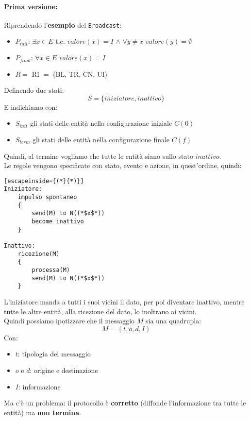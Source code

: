 \paragraph{Prima versione:} Riprendendo l'\textbf{esempio} del \texttt{Broadcast}: 
\begin{itemize}
	\item $P_{init}$: $\exists x \in E$ t.c. $valore (x) = I$ $\wedge$ $\forall y \neq x$ $valore (y) = \emptyset$
	\item $P_{final}$: $\forall x \in E$ $valore (x) = I$
	\item $R = $ RI $=$ (BL, TR, CN, UI)
\end{itemize}
Definendo due stati: 
$$ S = \{iniziatore, inattivo\} $$
E indichiamo con:
\begin{itemize}
	\item $S_{init}$ gli stati delle entità nella configurazione iniziale $C(0)$
	\item $S_{term}$ gli stati delle entità nella configurazione finale $C(f)$
\end{itemize}
Quindi, al termine vogliamo che tutte le entità siano sullo stato $inattivo$.\\

Le regole vengono specificate con stato, evento e azione, in quest'ordine, quindi: 
\begin{lstlisting}[escapeinside={(*}{*)}]
Iniziatore: 
	impulso spontaneo
	{	
		send(M) to N((*$x$*))
		become inattivo
	}
	
Inattivo: 
	ricezione(M)
	{	
		processa(M)
		send(M) to N((*$x$*))
	}
\end{lstlisting}

L'iniziatore manda a tutti i suoi vicini il dato, per poi diventare inattivo, mentre tutte le altre entità, alla ricezione del dato, lo inoltrano ai vicini.\\

Quindi possiamo ipotizzare che il messaggio $M$ sia una quadrupla: 
$$ M = (t, o, d, I)$$
Con: 
\begin{itemize}
	\item $t$: tipologia del messaggio
	\item $o$ e $d$: origine e destinazione
	\item $I$: informazione
\end{itemize}


Ma c'è un problema: il protocollo è \textbf{corretto} (diffonde l'informazione tra tutte le entità) ma \textbf{non termina}. \\

